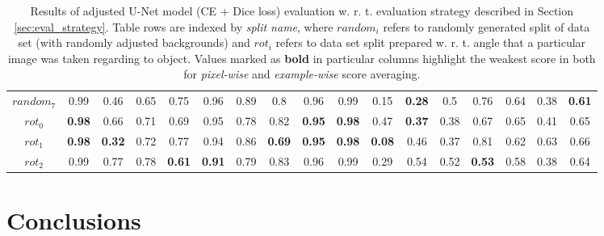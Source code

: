 \documentclass{article}
\begin{document}
\begin{center}
\begin{table}[H]
\begin{tabular}{ |c|c|c|c|c|c|c|c|c||c|c|c|c|c|c|c|c| }
$random_7$ &  0.99 & 0.46 & 0.65 & 0.75 & 0.96 & 0.89 & 0.8 & 0.96 &  0.99 & 0.15 & \textbf{0.28} & 0.5 & 0.76 & 0.64 & 0.38 & \textbf{0.61} \\ \hhline{|=|=|=|=|=|=|=|=|=|=|=|=|=|=|=|=|=|}   
$rot_0$ &  \textbf{0.98} & 0.66 & 0.71 & 0.69 & 0.95 & 0.78 & 0.82 & \textbf{0.95} &  \textbf{0.98} & 0.47 & \textbf{0.37} & 0.38 & 0.67 & 0.65 & 0.41 & 0.65 \\ \hline 
$rot_1$ &  \textbf{0.98} & \textbf{0.32} & 0.72 & 0.77 & 0.94 & 0.86 & \textbf{0.69} & \textbf{0.95} & \textbf{0.98} & \textbf{0.08} & 0.46 & 0.37 & 0.81 & 0.62 & 0.63 & 0.66 \\ \hline 
$rot_2$ &  0.99 & 0.77 & 0.78 & \textbf{0.61} & \textbf{0.91} & 0.79 & 0.83 & 0.96 &  0.99 & 0.29 & 0.54 & 0.52 & \textbf{0.53} & 0.58 & 0.38 & 0.64 \\ \hline 
\end{tabular} 
\caption{Results of adjusted U-Net \cite{unet} model (CE + Dice loss) evaluation w. r. t. evaluation strategy described in Section \ref{sec:eval_strategy}. Table rows are indexed by \textit{split name}, where $random_i$ refers to randomly generated split of data set (with randomly adjusted backgrounds) and $rot_i$ refers to data set split prepared w. r. t. angle that a particular image was taken regarding to object. Values marked as \textbf{bold} in particular columns highlight the weakest score in both for \textit{pixel-wise} and \textit{example-wise} score averaging.}
\label{tab:unet_ce_dice_results}
\end{table}
\end{center}

\section{Conclusions}
\label{sec:conclusions}
\end{document}
